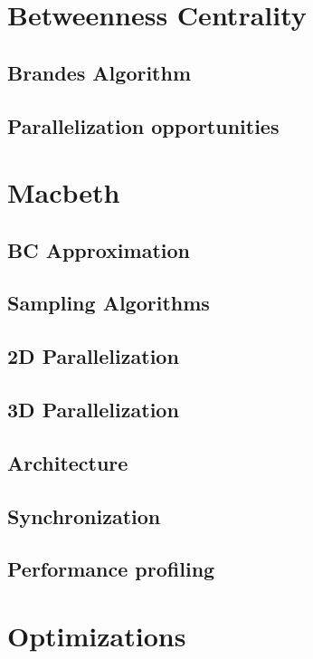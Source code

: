 \chapter{Betweenness Centrality}
\label{cha:betweenness}
\section{Brandes Algorithm}
\label{cha:brandes}
\section{Parallelization opportunities}
\label{cha:parallelization-opportunities}

\chapter{Macbeth}
\label{cha:macbeth}
\section{BC Approximation}
\label{cha:bc-approx}
\section{Sampling Algorithms}
\label{cha:sampling}
\section{2D Parallelization}
\label{cha:2d}
\section{3D Parallelization}
\label{cha:3d}
\section{Architecture}
\label{cha:macbeth-architecture}
\section{Synchronization}
\label{cha:synchronization}
\section{Performance profiling}
\label{cha:profiling}

\chapter{Optimizations}
\label{cha:optimizations}
